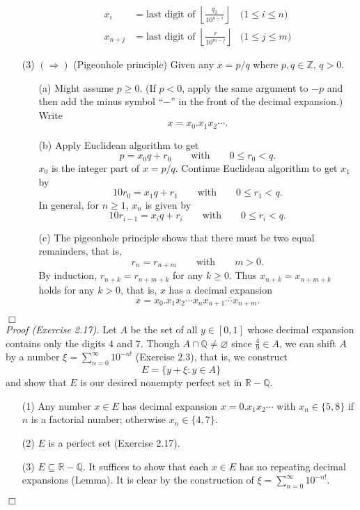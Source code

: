 \documentclass{article}
\begin{document}
\begin{enumerate}
\begin{enumerate}
\begin{align*}
    x_i &= \text{last digit of } \left\lfloor \frac{q_3}{10^{n-i}} \right\rfloor
      &\text{($1 \leq i \leq n$)} \\
    x_{n+j} &= \text{last digit of } \left\lfloor \frac{r}{10^{m-j}} \right\rfloor
      &\text{($1 \leq j \leq m$)}
  \end{align*}
  \end{enumerate}
\item[(3)]
$(\Longrightarrow)$
(Pigeonhole principle)
Given any $x = p/q$ where $p, q \in \mathbb{Z}$, $q > 0$.
  \begin{enumerate}
  \item[(a)]
  Might assume $p \geq 0$.
  (If $p < 0$, apply the same argument to $-p$
  and then add the minus symbol ``$-$'' in the front of the decimal expansion.)
  Write $$x = x_0.x_1 x_2 \cdots.$$
  \item[(b)]
  Apply Euclidean algorithm to get
  $$p = x_0 q + r_0 \qquad \text{with} \qquad 0 \leq r_0 < q.$$
  $x_0$ is the integer part of $x = p/q$.
  Continue Euclidean algorithm to get $x_1$ by
  $$10 r_0 = x_1 q + r_1 \qquad \text{with} \qquad 0 \leq r_1 < q.$$
  In general, for $n \geq 1$, $x_n$ is given by
  $$10 r_{i-1} = x_i q + r_i \qquad \text{with} \qquad 0 \leq r_i < q.$$
  \item[(c)]
  The pigeonhole principle shows that there must be two equal remainders,
  that is, $$r_n = r_{n+m} \qquad \text{with} \qquad m > 0.$$
  By induction, $r_{n+k} = r_{n+m+k}$ for any $k \geq 0$.
  Thus $x_{n+k} = x_{n+m+k}$ holds for any $k > 0$, that is,
  $x$ has a decimal expansion
  $$x = x_0.x_1 x_2 \cdots x_n \overline{x_{n+1} \cdots x_{n+m}}.$$
  \end{enumerate}
\end{enumerate}
$\Box$ \\



\emph{Proof (Exercise 2.17).}
Let $A$ be the set of all $y \in [0,1]$
whose decimal expansion contains only the digits $4$ and $7$.
Though $A \cap \mathbb{Q} \neq \varnothing$ since $\frac{4}{9} \in A$,
we can shift $A$ by a number $\xi = \sum_{n=0}^{\infty} 10^{-n!}$ (Exercise 2.3),
that is, we construct
$$E = \{ y + \xi : y \in A \}$$
and show that $E$ is our desired nonempty perfect set in $\mathbb{R}-\mathbb{Q}$.
\begin{enumerate}
\item[(1)]
Any number $x \in E$ has decimal expansion
$x = 0.x_1 x_2 \cdots$ with
$x_n \in \{5,8\}$ if $n$ is a factorial number; otherwise $x_n \in \{4,7\}$.
\item[(2)]
$E$ is a perfect set (Exercise 2.17).
\item[(3)]
$E \subseteq \mathbb{R}-\mathbb{Q}$.
It suffices to show that each $x \in E$ has no repeating decimal expansions (Lemma).
It is clear by the construction of $\xi = \sum_{n=0}^{\infty} 10^{-n!}$.
\end{enumerate}
$\Box$ \\
\end{document}
